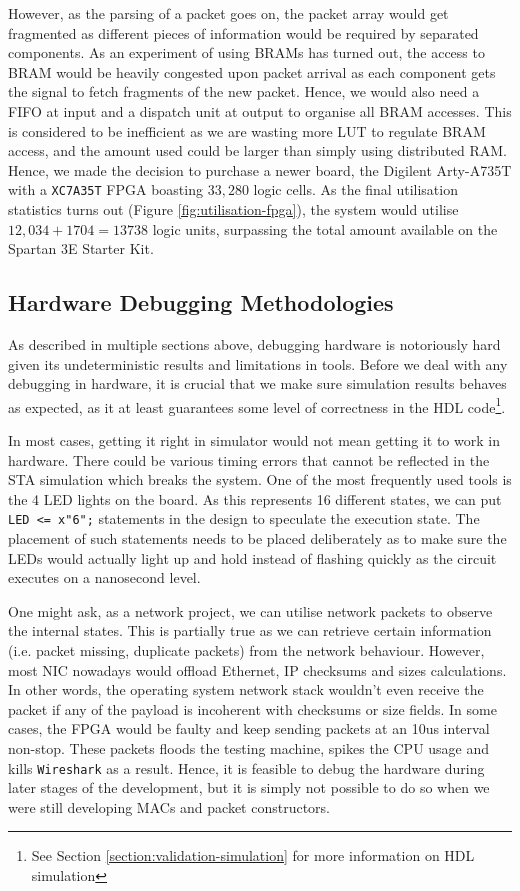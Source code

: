 \documentclass[a4paper]{report}
\newcommand{\code}{\texttt}
\begin{document}
However, as the parsing of a packet goes on, the packet array would get fragmented as different pieces of information would be required by separated components. As an experiment of using BRAMs has turned out, the access to BRAM would be heavily congested upon packet arrival as each component gets the signal to fetch fragments of the new packet. Hence, we would also need a FIFO at input and a dispatch unit at output to organise all BRAM accesses. This is considered to be inefficient as we are wasting more LUT to regulate BRAM access, and the amount used could be larger than simply using distributed RAM. Hence, we made the decision to purchase a newer board, the Digilent Arty-A735T with a \code{XC7A35T} FPGA boasting $33,280$ logic cells\cite{xilinx-documentation-artix}. As the final utilisation statistics turns out (Figure \ref{fig:utilisation-fpga}), the system would utilise $12,034 + 1704 = 13738$ logic units, surpassing the total amount available on the Spartan 3E Starter Kit.

\subsection{Hardware Debugging Methodologies}

As described in multiple sections above, debugging hardware is notoriously hard given its undeterministic results and limitations in tools. Before we deal with any debugging in hardware, it is crucial that we make sure simulation results behaves as expected, as it at least guarantees some level of correctness in the HDL code\footnote{See Section \ref{section:validation-simulation} for more information on HDL simulation}. 

In most cases, getting it right in simulator would not mean getting it to work in hardware. There could be various timing errors that cannot be reflected in the STA simulation which breaks the system. One of the most frequently used tools is the 4 LED lights on the board. As this represents 16 different states, we can put \code{LED <\null= x"6";} statements in the design to speculate the execution state. The placement of such statements needs to be placed deliberately as to make sure the LEDs would actually light up and hold instead of flashing quickly as the circuit executes on a nanosecond level.

One might ask, as a network project, we can utilise network packets to observe the internal states. This is partially true as we can retrieve certain information (i.e. packet missing, duplicate packets) from the network behaviour. However, most NIC nowadays would offload Ethernet, IP checksums and sizes calculations. In other words, the operating system network stack wouldn't even receive the packet if any of the payload is incoherent with checksums or size fields. In some cases, the FPGA would be faulty and keep sending packets at an 10us interval non-stop. These packets floods the testing machine, spikes the CPU usage and kills \code{Wireshark} as a result. Hence, it is feasible to debug the hardware during later stages of the development, but it is simply not possible to do so when we were still developing MACs and packet constructors.
\end{document}
